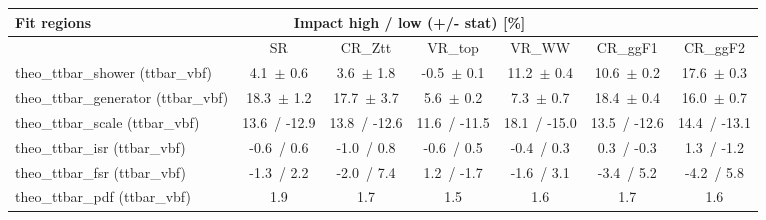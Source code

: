 \begin{tabular}{ l || c  c  c  c  c  c }
Fit regions & \multicolumn{4}{||c}{Impact high / low (+/- stat) [\%]} &  & \tabularnewline
\hline
 & SR & CR\_Ztt & VR\_top & VR\_WW & CR\_ggF1 & CR\_ggF2 \tabularnewline
\hline
theo\_ttbar\_shower (ttbar\_vbf) & 4.1\, $\pm$  0.6 & 3.6\, $\pm$  1.8 & -0.5\, $\pm$  0.1 & 11.2\, $\pm$  0.4 & 10.6\, $\pm$  0.2 & 17.6\, $\pm$  0.3\tabularnewline
theo\_ttbar\_generator (ttbar\_vbf) & 18.3\, $\pm$  1.2 & 17.7\, $\pm$  3.7 & 5.6\, $\pm$  0.2 & 7.3\, $\pm$  0.7 & 18.4\, $\pm$  0.4 & 16.0\, $\pm$  0.7\tabularnewline
theo\_ttbar\_scale (ttbar\_vbf) & 13.6\, / -12.9 & 13.8\, / -12.6 & 11.6\, / -11.5 & 18.1\, / -15.0 & 13.5\, / -12.6 & 14.4\, / -13.1\tabularnewline
theo\_ttbar\_isr (ttbar\_vbf) & -0.6\, / 0.6 & -1.0\, / 0.8 & -0.6\, / 0.5 & -0.4\, / 0.3 & 0.3\, / -0.3 & 1.3\, / -1.2\tabularnewline
theo\_ttbar\_fsr (ttbar\_vbf) & -1.3\, / 2.2 & -2.0\, / 7.4 & 1.2\, / -1.7 & -1.6\, / 3.1 & -3.4\, / 5.2 & -4.2\, / 5.8\tabularnewline
theo\_ttbar\_pdf (ttbar\_vbf) & 1.9 & 1.7 & 1.5 & 1.6 & 1.7 & 1.6
\end{tabular}

